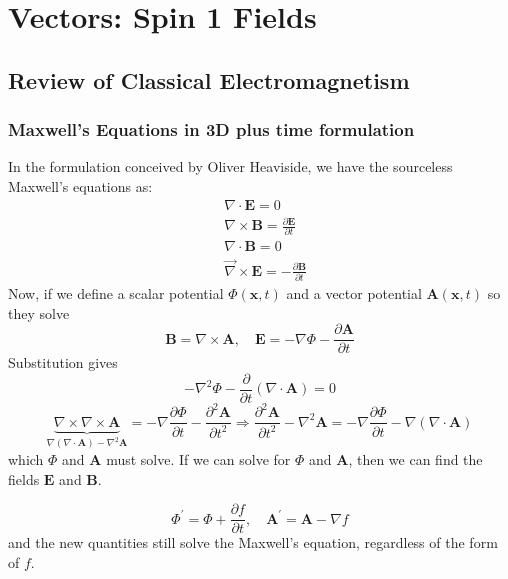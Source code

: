 \chapter{Vectors: Spin 1 Fields}
\section{Review of Classical Electromagnetism}
\subsection{Maxwell's Equations in 3D plus time formulation}
In the formulation conceived by Oliver Heaviside, we have the sourceless Maxwell's equations as:
\begin{equation}
\begin{aligned}
&\nabla \cdot \mathbf{E}=0\\
&\nabla \times \mathbf{B}=\frac{\partial \mathbf{E}}{\partial t}\\
&\nabla \cdot \mathbf{B}=0\\
&\vec{\nabla} \times \mathbf{E}=-\frac{\partial \mathbf{B}}{\partial t}
\end{aligned}
\end{equation}
Now, if we define a scalar potential $\Phi(\mathbf{x},t)$ and a vector potential $\mathbf{A}(\mathbf{x},t)$ so they solve
\begin{equation}
\mathbf{B}=\nabla \times \mathbf{A}, \quad \mathbf{E}=-\nabla \Phi-\frac{\partial \mathbf{A}}{\partial t}
\end{equation}
Substitution gives
\begin{equation}
-\nabla^{2} \Phi-\frac{\partial}{\partial t}(\nabla \cdot \mathbf{A})=0
\label{sourceless-maxwell1}
\end{equation}
\begin{equation}
\underbrace{\nabla \times \nabla \times \mathbf{A}}_{\nabla(\nabla \cdot \mathbf{A})-\nabla^{2} \mathbf{A}}=-\nabla \frac{\partial \Phi}{\partial t}-\frac{\partial^{2} \mathbf{A}}{\partial t^{2}}\Rightarrow \frac{\partial^{2} \mathbf{A}}{\partial t^{2}}-\nabla^{2} \mathbf{A}=-\nabla \frac{\partial \Phi}{\partial t}-\nabla(\nabla \cdot \mathbf{A})
\label{sourceless-maxwell2}
\end{equation}
which $\Phi$ and $\mathbf{A}$ must solve. If we can solve for $\Phi$ and $\mathbf{A}$, then we can find the fields $\mathbf{E}$ and $\mathbf{B}$.

\begin{equation}
\Phi^{\prime}=\Phi+\frac{\partial f}{\partial t}, \quad \mathbf{A}^{\prime}=\mathbf{A}-\nabla f
\end{equation}
and the new quantities still solve the Maxwell's equation, regardless of the form of $f$.

